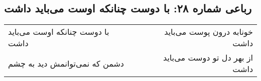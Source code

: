 \begin{center}
\section*{رباعی شماره ۲۸: با دوست چنانکه اوست می‌باید داشت}
\label{sec:028}
\begin{longtable}{l p{0.5cm} r}
با دوست چنانکه اوست می‌باید داشت
&&
خونابه درون پوست می‌باید داشت
\\
دشمن که نمی‌توانمش دید به چشم
&&
از بهر دل تو دوست می‌باید داشت
\\
\end{longtable}
\end{center}
